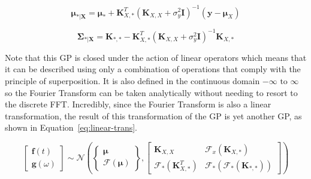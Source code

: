 \documentclass[12pt]{article}
\begin{document}
    \begin{equation}
        \boldsymbol{\mu}_{*\vert \mathbf{X}} = \boldsymbol{\mu}_* + \mathbf{K}_{X,*}^T (\mathbf{K}_{X,X} + \sigma^2_y \mathbf{I})^{-1} (\mathbf{y} - \boldsymbol{\mu}_X)\label{eq:18.52}
    \end{equation}

    \begin{equation}
        \boldsymbol{\Sigma}_{*\vert \mathbf{X}} = \mathbf{K}_{*,*} - \mathbf{K}_{X,*}^T (\mathbf{K}_{X,X} + \sigma^2_y \mathbf{I})^{-1} \mathbf{K}_{X,*}\label{eq:18.53}
    \end{equation}


    Note that this GP is closed under the action of linear operators which means that it can be described using only a combination of operations that comply with the principle of superposition.
    It is also defined in the continuous domain $-\infty \text{ to } \infty$ so the Fourier Transform can be taken analytically without needing to resort to the discrete FFT\@.
    Incredibly, since the Fourier Transform is also a linear transformation, the result of this transformation of the GP is yet another GP, as shown in Equation~\ref{eq:linear-trans}.

    \begin{equation}
        \left[
            \begin{array}{c}
                \mathbf{f}(t) \\
                \mathbf{g}(\omega)
            \end{array}
            \right]
        \sim \mathcal{N} \left(
        \left\{
        \begin{array}{c}
            \boldsymbol{\mu} \\
            \mathcal{F}(\boldsymbol{\mu})
        \end{array}
        \right\},
        \left[
            \begin{array}{cc}
                \mathbf{K}_{X,X} & \mathcal{F}_x (\mathbf{K}_{X,*}) \\
                \mathcal{F}_* (\mathbf{K}_{X,*}^T) & \mathcal{F}_* (\mathcal{F}_* (\mathbf{K}_{*,*}))
            \end{array}
            \right]
        \right)\label{eq:linear-trans}
    \end{equation}
\end{document}
